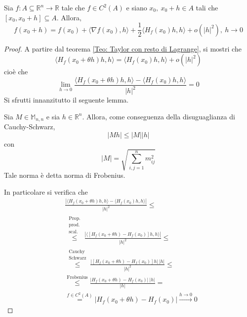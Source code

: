 \begin{theorem} \label{Teo: Taylor con resto di Peano}
    Sia $f: A \subseteq \mathbb{R}^n \to \mathbb{R}$ tale che $f \in C^2(A)$ e siano $x_0,\ x_0+h \in A$ tali che $[x_0, x_0+h] \subseteq A$. Allora, 
    \begin{equation}
        f(x_0+h)=f(x_0)+\langle \nabla f(x_0), h \rangle+ \frac{1}{2} \langle H_f(x_0)h, h\rangle + o(|h|^2),\ h \to 0 \label{Eq: Taylor con resto di Peano}
    \end{equation}
\end{theorem}
    \begin{proof}
        A partire dal teorema \ref{Teo: Taylor con resto di Lagrange}, si mostri che 
        \begin{equation}
            \langle H_f(x_0+\theta h)h, h \rangle = \langle H_f(x_0)h,h \rangle + o(|h|^2)
        \end{equation}
        cioè che 
        \begin{equation}
            \lim_{h\to 0}{\frac{\langle H_f(x_0+\theta h)h, h \rangle - \langle H_f(x_0)h, h \rangle}{|h|^2}}=0
        \end{equation}
        Si sfrutti innanzitutto il seguente lemma.
        \begin{lemma}
            Sia $M \in \mathbb{M}_{n,n}$ e sia $h \in \mathbb{R}^n$. Allora, come conseguenza della disuguaglianza di Cauchy-Schwarz, 
            \begin{equation}
                |Mh| \leq |M| |h|
            \end{equation}
            con 
            \begin{equation} \label{Eq: Norma di Frobenius}
                |M|=\sqrt{\sum\limits_{i,j=1}^{n}{m_{ij}^2}}
            \end{equation}
            Tale norma è detta norma di Frobenius.
        \end{lemma}
        In particolare si verifica che
        \begin{equation}
            \begin{aligned}
                &\frac{|\langle H_f(x_0+\theta h)h, h \rangle - \langle H_f(x_0)h, h\rangle|}{|h|^2}\leq\\
                &\overset{\substack{\text{Prop.}\\\text{prod.}\\ \text{scal.}}}{\leq}\frac{|\langle [H_f(x_0+\theta h)-H_f(x_0)]h, h \rangle|}{|h|^2} \leq\\
                &\overset{\substack{\text{Cauchy}\\\text{Schwarz}}}{\leq} \frac{|[H_f(x_0+\theta h)-H_f(x_0)]h|\ |h|}{|h|^2} \leq\\
                &\overset{\text{Frobenius}}{\leq} \frac{|H_f(x_0+\theta h)-H_f(x_0)|\ |h|}{|h|} =\\
                &\overset{f \in C^2(A)}{=}|H_f(x_0+\theta h)-H_f(x_0)| \overset{h \to 0}{\to} 0
            \end{aligned}
        \end{equation}
    \end{proof}
